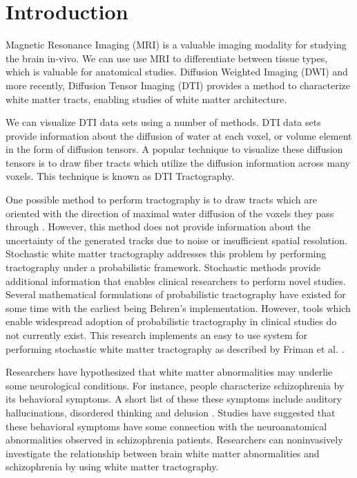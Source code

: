 \chapter{Introduction}

Magnetic Resonance Imaging (MRI) is a valuable imaging modality for studying the brain in-vivo.  We can use use MRI to differentiate between tissue types, which is valuable for anatomical studies.  Diffusion Weighted Imaging (DWI) and more recently, Diffusion Tensor Imaging (DTI) provides a method to characterize white matter tracts, enabling studies of white matter architecture.

We can visualize DTI data sets using a number of methods.  DTI data sets provide information about the diffusion of water at each voxel, or volume element in the form of diffusion tensors.  A popular technique to visualize these diffusion tensors is to draw fiber tracts which utilize the diffusion information across many voxels.  This technique is known as DTI Tractography.

One possible method to perform tractography is to draw tracts which are oriented with the direction of maximal water diffusion of the voxels they pass through \cite{frimanTMI06}.  However, this method does not provide information about the uncertainty of the generated tracks due to noise or insufficient spatial resolution.  Stochastic white matter tractography addresses this problem by performing tractography under a probabilistic framework.  Stochastic methods provide additional information that enables clinical researchers to perform novel studies.  Several mathematical formulations of probabilistic tractography have existed for some time with the earliest being Behren's implementation\cite{behrensMRM03}.  However, tools which enable widespread adoption of probabilistic tractography in clinical studies do not currently exist.  This research implements an easy to use system for performing stochastic white matter tractography as described by Friman et al. \cite{frimanTMI06}.

Researchers have hypothesized that white matter abnormalities may underlie some neurological conditions.  For instance, people characterize schizophrenia by its behavioral symptoms.  A short list of these these symptoms include auditory hallucinations, disordered thinking and delusion \cite{kubickiNYAS05}.  Studies have suggested that these behavioral symptoms have some connection with the neuroanatomical abnormalities observed in schizophrenia patients\cite{kubickiNYAS05}.  Researchers can noninvasively investigate the relationship between brain white matter abnormalities and schizophrenia by using white matter tractography.


